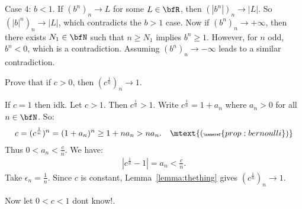\begin{solution}
            Case 4: $b < 1$. If $(b^n)_n \rightarrow L$ for some $L \in \bfR$, then $(|b^n|)_n \rightarrow |L|$. So $(|b|^n)_n \rightarrow |L|$, which contradicts the $b>1$ case. Now if $(b^n)_n \rightarrow +\infty$, then there exists $N_1 \in \bfN$ such that $n \geq N_1$ implies $b^n \geq 1$. However, for $n$ odd, $b^n < 0$, which is a contradiction. Assuming $(b^n)_n \rightarrow -\infty$ leads to a similar contradiction.
        \end{solution}

    \begin{example}
        Prove that if $c>0$, then $(c^{\frac{1}{n}})_n \rightarrow 1$.
    \end{example}
        \begin{solution}
            If $c=1$ then {\color{red} idk}. Let $c > 1$. Then $c^{\frac{1}{n}} > 1$. Write $c^{\frac{1}{n}} = 1 + a_n$ where $a_n > 0$ for all $n \in \bfN$. So:
                \begin{equation*}
                \begin{split}
                    c = (c^\frac{1}{n})^n = (1+a_n)^n \geq 1+na_n > na_n. \quad \mtext{\tiny (\nameref{prop:bernoulli})}
                \end{split}
                \end{equation*}
            Thus $0 < a_n < \frac{c}{n}$. We have:
                \begin{equation*}
                \begin{split}
                    \left|c^{\frac{1}{n}} - 1\right| = a_n < \frac{c}{n}.
                \end{split}
                \end{equation*}
            Take $\epsilon_n = \frac{1}{n}$. Since $c$ is constant, Lemma~\ref{lemma:thething} gives $(c^\frac{1}{n})_n \rightarrow 1$.

            Now let $0 < c < 1$ {\color{red} dont know!}.
        \end{solution}

    

